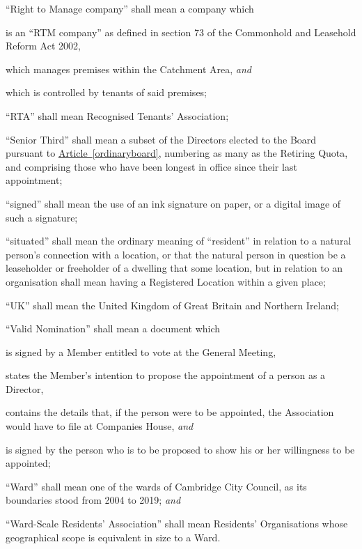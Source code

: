 \documentclass[12pt]{article}
\newcommand{\EC}[0]{Board}
\newcommand{\Exec}[0]{\EC{} }
\newcommand{\RA}[0]{Residents' Organisation}
\newcommand{\WSRA}[0]{Ward-Scale Residents' Association}
\newcommand{\RTA}[0]{Recognised Tenants' Association}
\newcommand{\ITand}[0]{\textit{and}}
\newcommand{\definition}[2]{\item ``#1'' shall mean #2}
\newcommand{\articleref}[1]{\hyperref[#1]{Article~\ref*{#1}}}
\begin{document}
\begin{constenum}
    \definition{Right to Manage company}{a company which
      \begin{constenum}
        \item is an ``RTM company'' as defined in section 73 of the
          Commonhold and Leasehold Reform Act 2002,
        \item which manages premises within the Catchment Area, \ITand
        \item which is controlled by tenants of said premises;
      \end{constenum}
    }

    \definition{RTA}{\RTA};

    \definition{Senior Third}{a subset of the Directors elected to the
      \Exec pursuant to \articleref{ordinaryboard}, numbering as many
      as the Retiring Quota, and comprising those who have been
      longest in office since their last appointment};

    \definition{signed}{the use of an ink signature on paper, or a
      digital image of such a signature};

    \definition{situated}{the ordinary meaning of ``resident'' in
      relation to a natural person's connection with a location, or
      that the natural person in question be a leaseholder or
      freeholder of a dwelling that some location, but in relation to
      an organisation shall mean having a Registered Location within a
      given place};

    \definition{UK}{the United Kingdom of Great Britain and Northern Ireland};

    \definition{Valid Nomination}{a document which
      \begin{constenum}

      \item is signed by a Member entitled to vote at the General Meeting,
      \item states the Member's intention to propose the appointment of a
        person as a Director,
      \item contains the details that, if the person were to be appointed,
        the Association would have to file at Companies House, \ITand
      \item is signed by the person who is to be proposed to show his or her
        willingness to be appointed;
      \end{constenum}
    }

    \definition{Ward}{one of the wards of Cambridge City Council, as
      its boundaries stood from 2004 to 2019}; \ITand

    \definition{\WSRA{}}{\RA{}s whose geographical
      scope is equivalent in size to a Ward}.

  \end{constenum}
\end{document}
